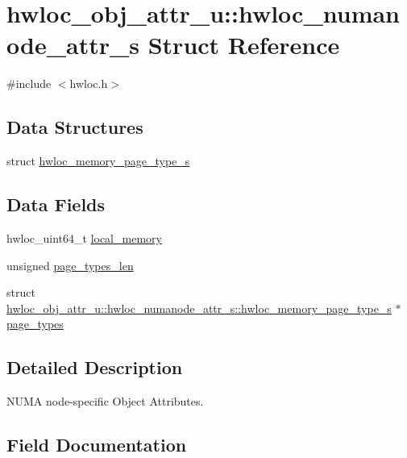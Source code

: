 \hypertarget{a00246}{}\section{hwloc\+\_\+obj\+\_\+attr\+\_\+u\+:\+:hwloc\+\_\+numanode\+\_\+attr\+\_\+s Struct Reference}
\label{a00246}


{\ttfamily \#include $<$hwloc.\+h$>$}

\subsection*{Data Structures}
\begin{DoxyCompactItemize}
\item 
struct \hyperlink{a00250}{hwloc\+\_\+memory\+\_\+page\+\_\+type\+\_\+s}
\end{DoxyCompactItemize}
\subsection*{Data Fields}
\begin{DoxyCompactItemize}
\item 
hwloc\+\_\+uint64\+\_\+t \hyperlink{a00246_a6703cbf2afbf63c9d60c5ff4dc0c73aa}{local\+\_\+memory}
\item 
unsigned \hyperlink{a00246_a513078122d403904e16723d30f583cb2}{page\+\_\+types\+\_\+len}
\item 
struct \hyperlink{a00250}{hwloc\+\_\+obj\+\_\+attr\+\_\+u\+::hwloc\+\_\+numanode\+\_\+attr\+\_\+s\+::hwloc\+\_\+memory\+\_\+page\+\_\+type\+\_\+s} $\ast$ \hyperlink{a00246_a66838d9d8a3934abca53089048dc28dd}{page\+\_\+types}
\end{DoxyCompactItemize}


\subsection{Detailed Description}
N\+U\+MA node-\/specific Object Attributes. 

\subsection{Field Documentation}
\mbox{\label{a00246_a6703cbf2afbf63c9d60c5ff4dc0c73aa}} 
